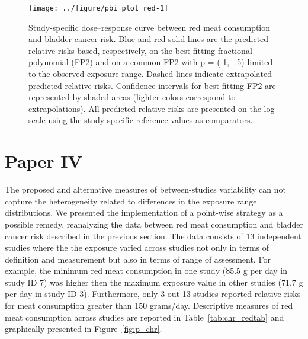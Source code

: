 \documentclass[11pt,a4paper,twoside,openany]{book}\usepackage{knitr}
\begin{document}
{\begin{knitrout}\footnotesize
{}\color{fgcolor}\begin{figure}[h]

{\centering \texttt{[image: ../figure/pbi\_plot\_red-1]} 

}

\caption[Study-specific dose--response curve between red meat consumption and bladder cancer risk]{Study-specific dose--response curve between red meat consumption and bladder cancer risk. Blue and red solid lines are the predicted relative risks based, respectively, on the best fitting fractional polynomial (FP2) and on a common FP2 with p = (-1, -.5) limited to the observed exposure range. Dashed lines indicate extrapolated predicted relative risks. Confidence intervals for best fitting FP2 are represented by shaded areas (lighter colors correspond to extrapolations). All predicted relative risks are presented on the log scale using the study-specific reference values as comparators.}\label{fig:pbi_plot_red}
\end{figure}


\end{knitrout}

\clearpage

\section{Paper IV}\label{sec:res_paperIV}

\noindent The proposed and alternative measures of between-studies variability can not capture the heterogeneity related to differences in the exposure range distributions. We presented the implementation of a point-wise strategy as a possible remedy, reanalyzing the data between red meat consumption and bladder cancer risk described in the previous section.
The data consists of 13 independent studies where the the exposure varied across studies not only in terms of definition and measurement but also in terms of range of assessment. For example, the minimum red meat consumption in one study (85.5 g per day in study ID 7) was higher then the maximum exposure value in other studies (71.7 g per day in study ID 3). Furthermore, only 3 out 13 studies reported relative risks for meat consumption greater than 150 grams/day. Descriptive measures of red meat consumption across studies are reported in Table~\ref{tab:chr_redtab} and graphically presented in Figure~\ref{fig:p_chr}.

}
\end{document}

